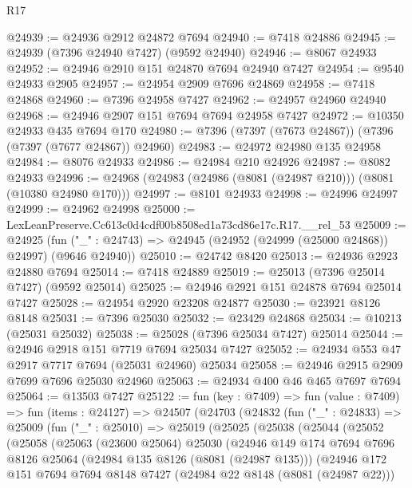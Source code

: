 \begin{lexlean}{R17}
\begin{coremodule}
@24939 := @24936 @2912 @24872 @7694
@24940 := @7418 @24886
@24945 := @24939 (@7396 @24940 @7427) (@9592 @24940)
@24946 := @8067 @24933
@24952 := @24946 @2910 @151 @24870 @7694 @24940 @7427
@24954 := @9540 @24933 @2905
@24957 := @24954 @2909 @7696 @24869
@24958 := @7418 @24868
@24960 := @7396 @24958 @7427
@24962 := @24957 @24960 @24940
@24968 := @24946 @2907 @151 @7694 @7694 @24958 @7427
@24972 := @10350 @24933 @435 @7694 @170
@24980 := @7396 (@7397 (@7673 @24867)) (@7396 (@7397 (@7677 @24867)) @24960)
@24983 := @24972 @24980 @135 @24958
@24984 := @8076 @24933
@24986 := @24984 @210 @24926
@24987 := @8082 @24933
@24996 := @24968 (@24983 (@24986 (@8081 (@24987 @210))) (@8081 (@10380 @24980 @170)))
@24997 := @8101 @24933
@24998 := @24996 @24997
@24999 := @24962 @24998
@25000 := LexLeanPreserve.Cc613c0d4cdf00b8508ed1a73cd86e17c.R17.__rel_53
@25009 := @24925
    (fun ("_" : @24743) => @24945 (@24952 (@24999 (@25000 @24868)) @24997) (@9646 @24940))
@25010 := @24742 @8420
@25013 := @24936 @2923 @24880 @7694
@25014 := @7418 @24889
@25019 := @25013 (@7396 @25014 @7427) (@9592 @25014)
@25025 := @24946 @2921 @151 @24878 @7694 @25014 @7427
@25028 := @24954 @2920 @23208 @24877
@25030 := @23921 @8126 @8148
@25031 := @7396 @25030
@25032 := @23429 @24868
@25034 := @10213 (@25031 @25032)
@25038 := @25028 (@7396 @25034 @7427) @25014
@25044 := @24946 @2918 @151 @7719 @7694 @25034 @7427
@25052 := @24934 @553 @47 @2917 @7717 @7694 (@25031 @24960) @25034
@25058 := @24946 @2915 @2909 @7699 @7696 @25030 @24960
@25063 := @24934 @400 @46 @465 @7697 @7694
@25064 := @13503 @7427
@25122 := fun (key : @7409) =>
  fun (value : @7409) =>
  fun (items : @24127) =>
  @24507
    (@24703
      (@24832
        (fun ("_" : @24833) =>
        @25009
          (fun ("_" : @25010) =>
          @25019
            (@25025
              (@25038
                (@25044
                  (@25052
                    (@25058
                      (@25063
                        (@23600 @25064)
                        @25030
                        (@24946
                          @149
                          @174
                          @7694
                          @7696
                          @8126
                          @25064
                          (@24984 @135 @8126 (@8081 (@24987 @135)))
                          (@24946
                            @172
                            @151
                            @7694
                            @7694
                            @8148
                            @7427
                            (@24984 @22 @8148 (@8081 (@24987 @22)))

\end{coremodule}
\end{lexlean}
